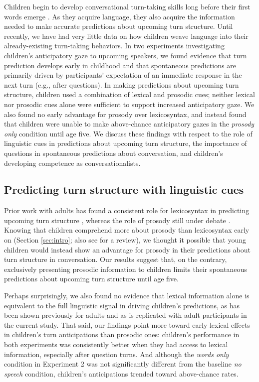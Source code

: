 \documentclass[authoryear, 12pt]{elsarticle}
\begin{document}
Children begin to develop conversational turn-taking skills long before their first words emerge \citep{bateson1975, hilbrink2015, jaffe2001, snow1977}. As they acquire language, they also acquire the information needed to make accurate predictions about upcoming turn structure. Until recently, we have had very little data on how children weave language into their already-existing turn-taking behaviors. In two experiments investigating children's anticipatory gaze to upcoming speakers, we found evidence that turn prediction develops early in childhood and that spontaneous predictions are primarily driven by participants' expectation of an immediate response in the next turn (e.g., after questions). In making predictions about upcoming turn structure, children used a combination of lexical and prosodic cues; neither lexical nor prosodic cues alone were sufficient to support increased anticipatory gaze. We also found no early advantage for prosody over lexicosyntax, and instead found that children were unable to make above-chance anticipatory gazes in the \textit{prosody only} condition until age five. We discuss these findings with respect to the role of linguistic cues in predictions about upcoming turn structure, the importance of questions in spontaneous predictions about conversation, and children's developing competence as conversationalists.

\subsection{Predicting turn structure with linguistic cues}

Prior work with adults has found a consistent role for lexicosyntax in predicting upcoming turn structure \citep{de-ruiter2006, magyari2012}, whereas the role of prosody still under debate \citep{duncan1972, ford1996, torreira2015}. Knowing that children comprehend more about prosody than lexicosyntax early on (Section \ref{sec:intro}; also see \citealp{speer2009} for a review), we thought it possible that young children would instead show an advantage for prosody in their predictions about turn structure in conversation. Our results suggest that, on the contrary, exclusively presenting prosodic information to children limits their spontaneous predictions about upcoming turn structure until age five.

Perhaps surprisingly, we also found no evidence that lexical information alone is equivalent to the full linguistic signal in driving children's predictions, as has been shown previously for adults \citep{magyari2012, de-ruiter2006} and as is replicated with adult participants in the current study. That said, our findings point more toward early lexical effects in children's turn anticipations than prosodic ones: children's performance in both experiments was consistently better when they had access to lexical information, especially after question turns. And although the \textit{words only} condition in Experiment 2 was not significantly different from the baseline \textit{no speech} condition, children's anticipations trended toward above-chance rates.
\end{document}
